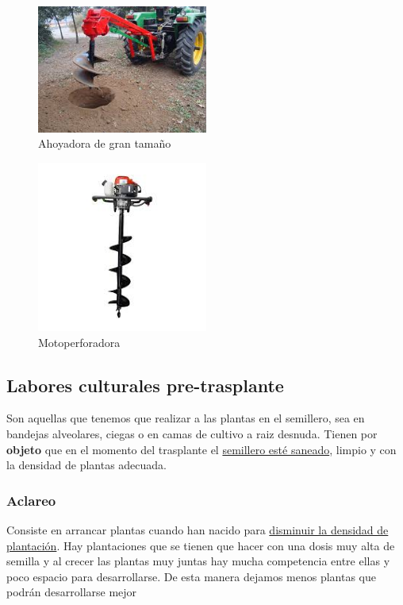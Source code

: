 \documentclass[a4paper,12pt,oneside]{article}
\begin{document}
\begin{enumerate}
\begin{center}
\begin{figure}[htbp]
\centering
\includegraphics[width=0.5\textwidth]{./img_uf1596/perf_tractor.jpg}
\caption{\label{fig:orged2631f}
Ahoyadora de gran tamaño}
\end{figure}

\begin{figure}[htbp]
\centering
\includegraphics[width=0.5\textwidth]{./img_uf1596/motoperforadora.jpg}
\caption{\label{fig:org0322ff4}
Motoperforadora}
\end{figure}
\end{center}
\end{enumerate}

\subsection{Labores culturales pre-trasplante}
\label{sec:orgab5463b}

Son aquellas que tenemos que realizar a las plantas en el semillero, sea en
bandejas alveolares, ciegas o en camas de cultivo a raiz desnuda. Tienen por
\textbf{objeto} que en el momento del trasplante el \uline{semillero esté saneado}, limpio y
con la densidad de plantas adecuada.  

\subsubsection{Aclareo}
\label{sec:orgab60ec1}
Consiste en arrancar plantas cuando han nacido para \uline{disminuir la densidad de 
plantación}. Hay plantaciones que se tienen que hacer con una dosis muy alta de
semilla y al crecer las plantas muy juntas hay mucha competencia entre ellas y
poco espacio para desarrollarse. De esta manera dejamos menos plantas que podrán
desarrollarse mejor
\end{document}
